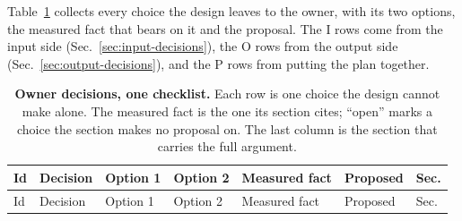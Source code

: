 Table~\ref{tab:decisions} collects every choice the design leaves to the owner, with
its two options, the measured fact that bears on it and the proposal. The I rows come
from the input side (Sec.~\ref{sec:input-decisions}), the O rows from the output side
(Sec.~\ref{sec:output-decisions}), and the P rows from putting the plan together.

\begin{landscape}
\scriptsize
\setlength{\tabcolsep}{3pt}
\begin{longtable}{>{\raggedright\arraybackslash}p{6mm}>{\raggedright\arraybackslash}p{26mm}>{\raggedright\arraybackslash}p{38mm}>{\raggedright\arraybackslash}p{38mm}>{\raggedright\arraybackslash}p{74mm}>{\raggedright\arraybackslash}p{40mm}>{\raggedright\arraybackslash}p{9mm}}
\caption[]{\textbf{Owner decisions, one checklist.} Each row is one choice the design
cannot make alone. The measured fact is the one its section cites; ``open'' marks a
choice the section makes no proposal on. The last column is the section that carries the
full argument.}\label{tab:decisions}\\
\toprule
Id & Decision & Option 1 & Option 2 & Measured fact & Proposed & Sec. \\
\midrule
\endfirsthead
\toprule
Id & Decision & Option 1 & Option 2 & Measured fact & Proposed & Sec. \\
\midrule
\endhead

\end{longtable}
\end{landscape}
